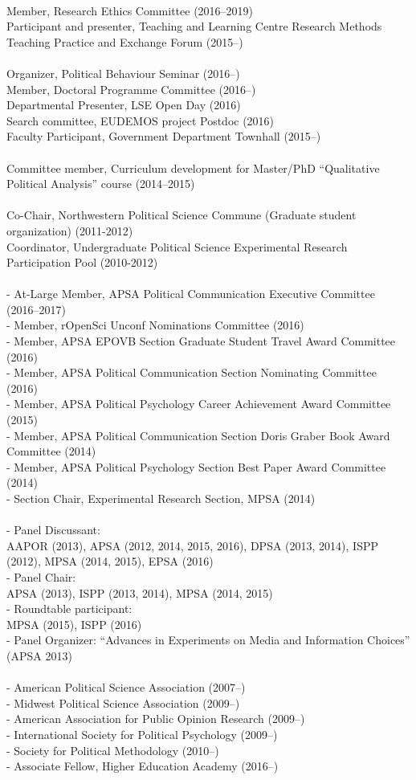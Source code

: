\documentclass[12pt]{article}
\renewcommand{\section}[1]{\pagebreak[3]%
    \llap{\scshape\smash{\parbox[t]{\marginparwidth}{\raggedright {\color{lg}#1}}}}%
    \vspace{-\baselineskip}\par}
\newcommand{\topic}[1]{\pagebreak[3]\indent {\color{lg}{\footnotesize #1 }}\\}
\newcommand{\entry}[1]{\indent {\color{lg}\guillemotright}\hspace{2pt}#1\vspace{.25em}\\}
\newcommand{\subentry}[1]{{\color{lg}-} #1\vspace{.25em}\\}
\begin{document}
\section{Institutional\\ \& Professional Service}
\topic{Institutional (London School of Economics and Political Science)}
	\entry{Member, Research Ethics Committee (2016--2019)}
	\entry{Participant and presenter, Teaching and Learning Centre Research Methods Teaching Practice and Exchange Forum (2015--)}
\topic{Departmental (London School of Economics and Political Science)}
	\entry{Organizer, Political Behaviour Seminar (2016--)}
	\entry{Member, Doctoral Programme Committee (2016--)}
	\entry{Departmental Presenter, LSE Open Day (2016)}
	\entry{Search committee, EUDEMOS project Postdoc (2016)}
	\entry{Faculty Participant, Government Department Townhall (2015--)}
\topic{Departmental (Aarhus University)}
	\entry{Committee member, Curriculum development for Master/PhD ``Qualitative Political Analysis'' course (2014--2015)}
\topic{Departmental (Northwestern University)}
	\entry{Co-Chair, Northwestern Political Science Commune (Graduate student organization) (2011-2012)}
	\entry{Coordinator, Undergraduate Political Science Experimental Research Participation Pool (2010-2012)}
\topic{Disciplinary Committees}
		\subentry{At-Large Member, APSA Political Communication Executive Committee (2016--2017)}
		\subentry{Member, rOpenSci Unconf Nominations Committee (2016)}
		\subentry{Member, APSA EPOVB Section Graduate Student Travel Award Committee (2016)}
		\subentry{Member, APSA Political Communication Section Nominating Committee (2016)}
		\subentry{Member, APSA Political Psychology Career Achievement Award Committee (2015)}
		\subentry{Member, APSA Political Communication Section Doris Graber Book Award Committee (2014)}
		\subentry{Member, APSA Political Psychology Section Best Paper Award Committee (2014)}
		\subentry{Section Chair, Experimental Research Section, MPSA (2014)}
\topic{Service at Professional Conferences}
		\subentry{Panel Discussant:\\ AAPOR (2013), APSA (2012, 2014, 2015, 2016), DPSA (2013, 2014), ISPP (2012), MPSA (2014, 2015), EPSA (2016)}
		\subentry{Panel Chair:\\ APSA (2013), ISPP (2013, 2014), MPSA (2014, 2015)}
		\subentry{Roundtable participant:\\ MPSA (2015), ISPP (2016)}
		\subentry{Panel Organizer: ``Advances in Experiments on Media and Information Choices'' (APSA 2013)}
\topic{Professional Memberships:}
		\subentry{American Political Science Association (2007--)}
		\subentry{Midwest Political Science Association (2009--)}
		\subentry{American Association for Public Opinion Research (2009--)}
		\subentry{International Society for Political Psychology (2009--)}
		\subentry{Society for Political Methodology (2010--)}
		\subentry{Associate Fellow, Higher Education Academy (2016--)}
\end{document}
